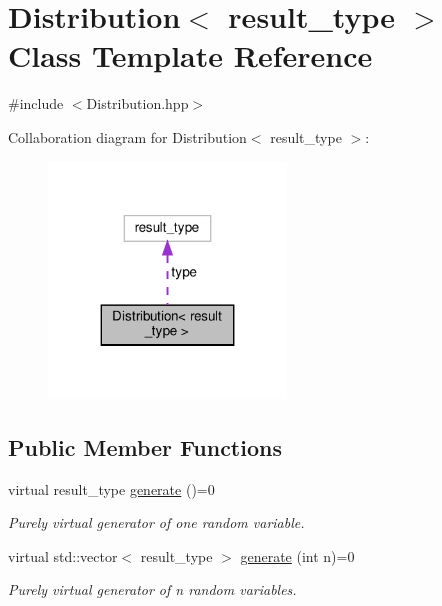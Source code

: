 \hypertarget{class_distribution}{}\section{Distribution$<$ result\+\_\+type $>$ Class Template Reference}
\label{class_distribution}


{\ttfamily \#include $<$Distribution.\+hpp$>$}



Collaboration diagram for Distribution$<$ result\+\_\+type $>$\+:\nopagebreak
\begin{figure}[H]
\begin{center}
\leavevmode
\includegraphics[width=179pt]{class_distribution__coll__graph}
\end{center}
\end{figure}
\subsection*{Public Member Functions}
\begin{DoxyCompactItemize}
\item 
\mbox{\label{class_distribution_a5cd9af81203aa52556c25b34ba307b7d}} 
virtual result\+\_\+type \hyperlink{class_distribution_a5cd9af81203aa52556c25b34ba307b7d}{generate} ()=0
\begin{DoxyCompactList}\small\item\em Purely virtual generator of one random variable. \end{DoxyCompactList}\item 
\mbox{\label{class_distribution_a827af71c147c83b35829e8b58ec0c089}} 
virtual std\+::vector$<$ result\+\_\+type $>$ \hyperlink{class_distribution_a827af71c147c83b35829e8b58ec0c089}{generate} (int n)=0
\begin{DoxyCompactList}\small\item\em Purely virtual generator of n random variables. \end{DoxyCompactList}\end{DoxyCompactItemize}
